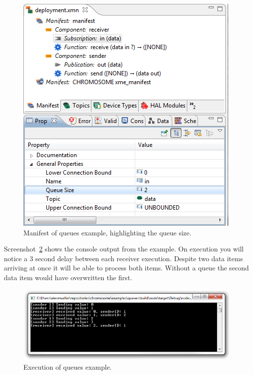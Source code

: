 \begin{figure}[htpb]
	\centering
	\includegraphics[scale=0.75]{figures/example_queues_manifest.png}
	\caption{Manifest of queues example, highlighting the queue size.}
	\label{fig:example_queues_manifest}
\end{figure}

Screenshot~\ref{fig:example_queues} shows the console output from the example.
On execution you will notice a 3 second delay between each receiver execution.
Despite two data items arriving at once it will be able to process both items.
Without a queue the second data item would have overwritten the first.

\begin{figure}[htpb]
	\centering
	\includegraphics[scale=0.5]{figures/example_queues.png}
	\caption{Execution of queues example.}
	\label{fig:example_queues}
\end{figure}
